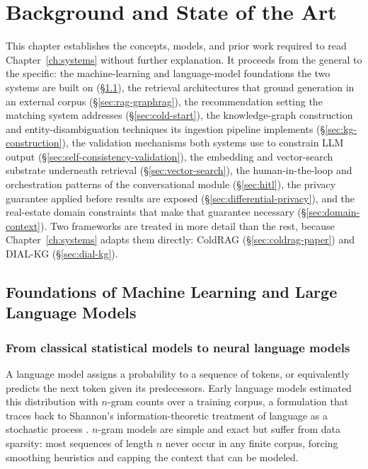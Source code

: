 \chapter{Background and State of the Art}
\label{ch:background}

This chapter establishes the concepts, models, and prior work required to read Chapter~\ref{ch:systems} without further explanation. It proceeds from the general to the specific: the machine-learning and language-model foundations the two systems are built on (\S\ref{sec:ml-foundations}), the retrieval architectures that ground generation in an external corpus (\S\ref{sec:rag-graphrag}), the recommendation setting the matching system addresses (\S\ref{sec:cold-start}), the knowledge-graph construction and entity-disambiguation techniques its ingestion pipeline implements (\S\ref{sec:kg-construction}), the validation mechanisms both systems use to constrain LLM output (\S\ref{sec:self-consistency-validation}), the embedding and vector-search substrate underneath retrieval (\S\ref{sec:vector-search}), the human-in-the-loop and orchestration patterns of the conversational module (\S\ref{sec:hitl}), the privacy guarantee applied before results are exposed (\S\ref{sec:differential-privacy}), and the real-estate domain constraints that make that guarantee necessary (\S\ref{sec:domain-context}). Two frameworks are treated in more detail than the rest, because Chapter~\ref{ch:systems} adapts them directly: ColdRAG (\S\ref{sec:coldrag-paper}) and DIAL-KG (\S\ref{sec:dial-kg}).

\section{Foundations of Machine Learning and Large Language Models}
\label{sec:ml-foundations}

\subsection{From classical statistical models to neural language models}
\label{sec:classical-to-neural}

A language model assigns a probability to a sequence of tokens, or equivalently predicts the next token given its predecessors. Early language models estimated this distribution with $n$-gram counts over a training corpus, a formulation that traces back to Shannon's information-theoretic treatment of language as a stochastic process \citep{shannon1948mathematical}. $n$-gram models are simple and exact but suffer from data sparsity: most sequences of length $n$ never occur in any finite corpus, forcing smoothing heuristics and capping the context that can be modeled.

